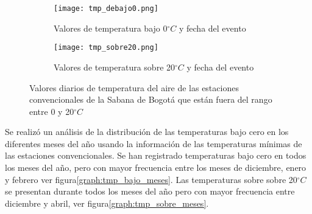 \documentclass[11pt]{article}
\def\celc{$^{\circ}C$ }%
\begin{document}
\begin{figure}[H]
	\begin{subfigure}[b]{\linewidth}
	\begin{center}
	\texttt{[image: tmp\_debajo0.png]}
		
		\caption{Valores de temperatura bajo 0\celc y fecha del evento}		
		\label{graph:tmp_bajo0}
		
	\end{center}
	\end{subfigure}
	
	\begin{subfigure}[b]{\linewidth}
	\begin{center}
	\texttt{[image: tmp\_sobre20.png]}
		
		\caption{Valores de temperatura sobre 20\celc y fecha del evento}		
		\label{graph:tmp_sobre20}
		
	\end{center}
	\end{subfigure}
	
	
	\caption{Valores diarios de temperatura del aire de las estaciones convencionales de la Sabana de Bogotá que están fuera del rango entre 0 y 20\celc}		
	\label{graph:limites}

\end{figure}

Se realizó un análisis de la distribución de las temperaturas bajo cero en los diferentes meses del año usando la información de las temperaturas mínimas de las estaciones convencionales. Se han registrado temperaturas bajo cero en todos los meses del año, pero con mayor frecuencia entre los meses de diciembre, enero y febrero ver figura\ref{graph:tmp_bajo_meses}. Las temperaturas sobre sobre 20\celc se presentan durante todos los meses del año pero con mayor frecuencia entre diciembre y abril, ver figura\ref{graph:tmp_sobre_meses}.
\end{document}
